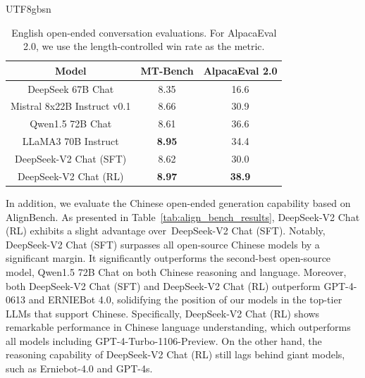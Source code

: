 \documentclass[11pt, a4paper, logo, copyright, nonumbering]{deepseek}
\newcommand{\dsviisft}{DeepSeek-V2 Chat (SFT)}
\newcommand{\dsviirl}{DeepSeek-V2 Chat (RL)}
\begin{document}
\begin{CJK*}{UTF8}{gbsn}
\begin{table}[!t]
    \centering
    \begin{tabular}{c | c c}
    \toprule
    \textbf{Model} & \textbf{MT-Bench} & \textbf{AlpacaEval 2.0} \\
    \midrule
    DeepSeek 67B Chat & 8.35 & 16.6  \\
    Mistral 8x22B Instruct v0.1 & 8.66 & 30.9 \\
    Qwen1.5 72B Chat & 8.61 & 36.6 \\
    LLaMA3 70B Instruct & \textbf{8.95} & 34.4 \\
    \dsviisft & 8.62 & 30.0 \\
    \dsviirl & \textbf{8.97} & \textbf{38.9} \\
    \bottomrule
    \end{tabular}
    \caption{
    English open-ended conversation evaluations. 
    For AlpacaEval 2.0, we use the length-controlled win rate as the metric. 
    }
    \label{tab:open} 
\end{table}

In addition, we evaluate the Chinese open-ended generation capability based on AlignBench. 
As presented in Table~\ref{tab:align_bench_results}, \dsviirl{} exhibits a slight advantage over~\dsviisft{}. 
Notably, \dsviisft{} surpasses all open-source Chinese models by a significant margin. 
It significantly outperforms the second-best open-source model, Qwen1.5 72B Chat on both Chinese reasoning and language. 
Moreover, both \dsviisft{} and \dsviirl{} outperform GPT-4-0613 and ERNIEBot 4.0, solidifying the position of our models in the top-tier LLMs that support Chinese. 
Specifically, \dsviirl{} shows remarkable performance in Chinese language understanding, which outperforms all models including GPT-4-Turbo-1106-Preview. 
On the other hand, the reasoning capability of \dsviirl{} still lags behind giant models, such as Erniebot-4.0 and GPT-4s. 


\end{CJK*}
\end{document}
